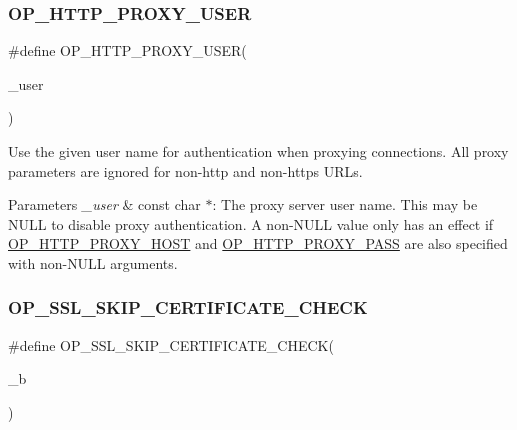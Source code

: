 \subsubsection{\texorpdfstring{O\+P\+\_\+\+H\+T\+T\+P\+\_\+\+P\+R\+O\+X\+Y\+\_\+\+U\+S\+ER}{OP\_HTTP\_PROXY\_USER}}
{\footnotesize\ttfamily \#define O\+P\+\_\+\+H\+T\+T\+P\+\_\+\+P\+R\+O\+X\+Y\+\_\+\+U\+S\+ER(\begin{DoxyParamCaption}\item[{}]{\+\_\+user }\end{DoxyParamCaption})}

Use the given user name for authentication when proxying connections. All proxy parameters are ignored for non-\/http and non-\/https U\+R\+Ls. 
\begin{DoxyParams}{Parameters}
{\em \+\_\+user} & const char $\ast$\+: The proxy server user name. This may be {\ttfamily N\+U\+LL} to disable proxy authentication. A non-\/{\ttfamily N\+U\+LL} value only has an effect if \hyperlink{group__url__options_gab3b517acdb74c0d0b51800af86a58876}{O\+P\+\_\+\+H\+T\+T\+P\+\_\+\+P\+R\+O\+X\+Y\+\_\+\+H\+O\+ST} and \hyperlink{group__url__options_gaad96c33557407e406cca89477b2e7892}{O\+P\+\_\+\+H\+T\+T\+P\+\_\+\+P\+R\+O\+X\+Y\+\_\+\+P\+A\+SS} are also specified with non-\/{\ttfamily N\+U\+LL} arguments. \\
\hline
\end{DoxyParams}
\mbox{\label{group__url__options_ga71080150b55e223be2710a0307108b72}} 
\subsubsection{\texorpdfstring{O\+P\+\_\+\+S\+S\+L\+\_\+\+S\+K\+I\+P\+\_\+\+C\+E\+R\+T\+I\+F\+I\+C\+A\+T\+E\+\_\+\+C\+H\+E\+CK}{OP\_SSL\_SKIP\_CERTIFICATE\_CHECK}}
{\footnotesize\ttfamily \#define O\+P\+\_\+\+S\+S\+L\+\_\+\+S\+K\+I\+P\+\_\+\+C\+E\+R\+T\+I\+F\+I\+C\+A\+T\+E\+\_\+\+C\+H\+E\+CK(\begin{DoxyParamCaption}\item[{}]{\+\_\+b }\end{DoxyParamCaption})}

